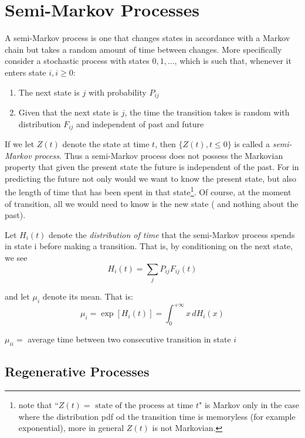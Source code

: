 \section{Semi-Markov Processes}
A semi-Markov process is one that changes states in accordance with a Markov
chain but takes a random amount of time between changes. More specifically
consider a stochastic process with states $0, 1, ...  $, which is such that, whenever
it enters state $i, i\geq 0$:
\begin{enumerate}
	\item The next state is $j$ with probability $P_{ij}$
	\item Given that the next state is $j$, the time the transition takes is random with distribution $F_{ij}$ and independent of past and future
\end{enumerate}
If we let $Z(t)$ denote the state at time $t$, then $\{Z(t), t\leq 0\}$ is called a \emph{semi-Markov
process}.
Thus a semi-Markov process does not possess the Markovian property that
given the present state the future is independent of the past. For in predicting
the future not only would we want to know the present state, but also the
length of time that has been spent in that state\footnote{note that ``$Z(t) = \mbox{ state of the process at time } t$" is Markov only in the case where the distribution pdf od the transition time is memoryless (for example exponential), more in general $Z(t)$ is not Markovian.}. Of course, at the moment of transition, all we would need to know is the new state ( and nothing about
the past). %

Let $H_i(t)$ denote the \emph{distribution of time} that the semi-Markov process spends
in state i before making a transition. That is, by conditioning on the next
state, we see
	\begin{equation}
		H_i(t) = \sum_j P_{ij} F_{ij}(t)
	\end{equation}

and let $\mu_i$ denote its mean. That is:
	\begin{equation}
		 \mu_i = \exp[H_i(t)] = \int_{0}^{+\infty}x \,dH_i(x)
	\end{equation}

\begin{definition}
	$\mu_{ii} = $ average time between two consecutive transition in state $i$
\end{definition}

\subsection{Regenerative Processes}

